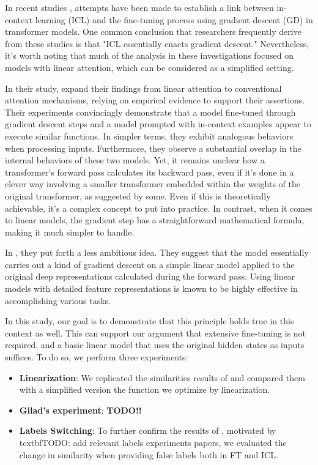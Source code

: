 In recent studies \cite{pmlr-v202-von-oswald23a,dai2023gpt}, attempts have been made to establish a link between in-context learning (ICL) and the fine-tuning process using gradient descent (GD) in transformer models. One common conclusion that researchers frequently derive from these studies is that "ICL essentially enacts gradient descent." Nevertheless, it's worth noting that much of the analysis in these investigations focused on models with linear attention, which can be considered as a simplified setting.

In their study, \cite{dai2023gpt} expand their findings from linear attention to conventional attention mechanisms, relying on empirical evidence to support their assertions.
Their experiments convincingly demonstrate that a model fine-tuned through gradient descent steps and a model prompted with in-context examples appear to execute similar functions. In simpler terms, they exhibit analogous behaviors when processing inputs. Furthermore, they observe a substantial overlap in the internal behaviors of these two models.
Yet, it remains unclear how a transformer's forward pass calculates its backward pass, even if it's done in a clever way involving a smaller transformer embedded within the weights of the original transformer, as suggested by some. Even if this is theoretically achievable, it's a complex concept to put into practice. In contrast, when it comes to linear models, the gradient step has a straightforward mathematical formula, making it much simpler to handle.

In \cite{pmlr-v202-von-oswald23a}, they put forth a less ambitious idea. They suggest that the model essentially carries out a kind of gradient descent on a simple linear model applied to the original deep representations calculated during the forward pass.
Using linear models with detailed feature representations is known to be highly effective in accomplishing various tasks.


In this study, our goal is to demonstrate that this principle holds true in this context as well. This can support our argument that extensive fine-tuning is not required, and a basic linear model that uses the original hidden states as inputs suffices.
To do so, we perform three experiments:
\begin{itemize}
    \item \textbf{Linearization}: We replicated the similarities results of \cite{dai2023gpt} and compared them with a simplified version the function we optimize by linearization.
    \item \textbf{Gilad's experiment}: \textbf{TODO!!}
    \item \textbf{Labels Switching}: To further confirm the results of \cite{dai2023gpt}, motivated by textbf{TODO: add relevant labels experiments papers}, we evaluated the change in similarity when providing false labels both in FT and ICL.
\end{itemize}
